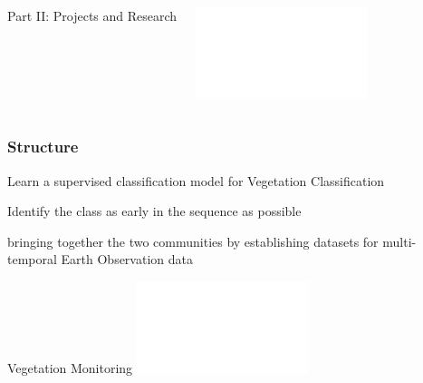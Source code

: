 \documentclass[%
  aspectratio=169,
  9pt,
  USenglish,
  titlegraphic, %
  affiliationintitlepagehead,
  affiliation,
]{beamer}
\begin{document}
{
	\begin{frame}[plain]
	
	\vfill
	\Huge\color{white}
	\begin{center}
		\begin{columns}
			\vspace{3.5em}
			
			\hfill 
			Part II: Projects and Research
			
			\includegraphics[width=5cm]{images/TUM-white}
		\end{columns}
	\end{center}
	
	\vfill
\end{frame}
}





\begin{frame}
\frametitle{Structure}

\Large

\begin{description}[itemsep=1em]
	\item<1->[Vegetation Monitoring] Learn a supervised classification model for Vegetation Classification
	\item<2->[Early Time Series Classification] Identify the class as early in the sequence as possible
	\item<3->[Compiling Public Datasets] bringing together the two communities by establishing datasets for multi-temporal Earth Observation data
\end{description}
\end{frame}

{
	\begin{frame}[plain]
	\vfill
	\begin{center}
		\Huge\color{tumwhite}
		Vegetation Monitoring
		\includegraphics[width=5cm]{images/TUM-white}
	\end{center}
	
	\vfill
\end{frame}
}
\end{document}
